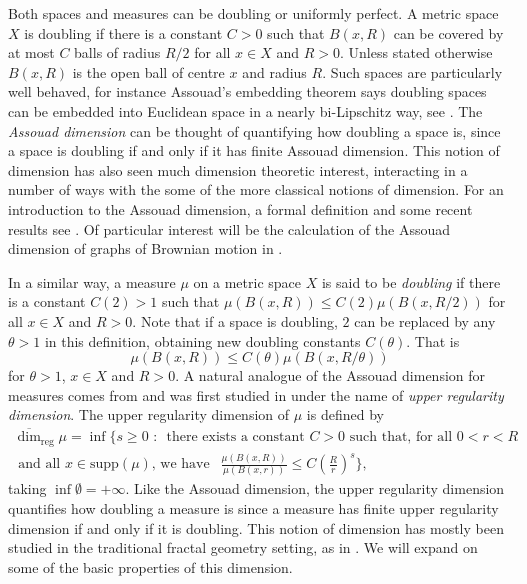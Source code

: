\documentclass[12pt]{amsart}
\numberwithin{equation}{section}
\renewcommand{\le}{\leqslant}
\renewcommand{\geq}{\geqslant}
\renewcommand{\leq}{\leqslant}
\begin{document}
Both spaces and measures can be doubling or uniformly perfect. A metric space $X$ is doubling if there is a constant $C > 0$ such that $B(x,R)$ can be covered by at most $C$ balls of radius $R/2$ for all $x\in X$ and $R > 0$. Unless stated otherwise $B(x,R)$ is the open ball of centre $x$ and radius $R$. Such spaces are particularly well behaved, for instance Assouad's embedding theorem says doubling spaces can be embedded into Euclidean space in a nearly bi-Lipschitz way, see \cite{Assouad}. The \textit{Assouad dimension} can be thought of quantifying how doubling a space is, since a space is doubling if and only if it has finite Assouad dimension. This notion of dimension has also seen much dimension theoretic interest, interacting in a number of ways with the some of the more classical notions of dimension. For an introduction to the Assouad dimension, a formal definition and some recent results see \cite{probs jons stoof}. Of particular interest will be the calculation of the Assouad dimension of graphs of Brownian motion in \cite{me and han}.

In a similar way, a measure $\mu$ on a metric space $X$ is said to be \textit{doubling} if there is a constant $C(2) > 1$ such that $\mu(B(x,R)) \le C(2) \mu(B(x,R/2))$ for all $x \in X$ and $R> 0$. Note that if a space is doubling, $2$ can be replaced by any $\theta > 1$ in this definition, obtaining new doubling constants $C(\theta)$. That is 
\[
\mu(B(x,R)) \le C(\theta) \mu(B(x,R/\theta))
\]
for $\theta > 1$, $x\in X$ and $R > 0$. A natural analogue of the Assouad dimension for measures comes from \cite{lukainen?} and was first studied in \cite{Anti} under the name of \textit{upper regularity dimension}. The upper regularity dimension of $\mu$ is defined by 
\begin{multline*} 
\overline{\dim}_{\text{reg}} \mu = \inf \Bigg\{ s \geq 0 \, \,  : \,  \text{ there exists a  constant }C  > 0\text{  such that, for all  $0< r< R $} \\ \text{  and all $x \in \text{supp} (\mu)$, we have }  \ \  \frac{\mu(B(x,R))}{\mu(B(x,r))} \leq C\left(\frac{R}{r}\right)^{s} \Bigg\},
\end{multline*}
taking $\inf \emptyset = + \infty$. Like the Assouad dimension, the upper regularity dimension quantifies how doubling a measure is since a measure has finite upper regularity dimension if and only if it is doubling. This notion of dimension has mostly been studied in the traditional fractal geometry setting, as in \cite{peeps}. We will expand on some of the basic properties of this dimension.
\end{document}
